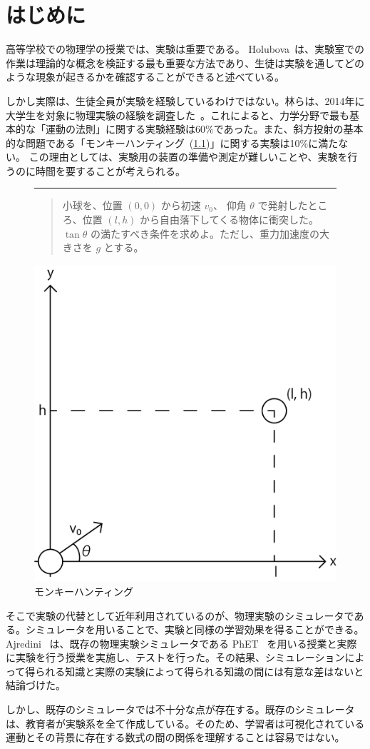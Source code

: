 \chapter{はじめに} \label{intro}

高等学校での物理学の授業では、実験は重要である。
Holubova~\cite{holubova_2019}は、実験室での作業は理論的な概念を検証する最も重要な方法であり、生徒は実験を通してどのような現象が起きるかを確認することができると述べている。

しかし実際は、生徒全員が実験を経験しているわけではない。林らは、2014年に大学生を対象に物理実験の経験を調査した~\cite{2015KJ00010038066}。これによると、力学分野で最も基本的な「運動の法則」に関する実験経験は60\%であった。また、斜方投射の基本的な問題である「モンキーハンティング~(\ref{monkey_hunting})」に関する実験は10\%に満たない。
この理由としては、実験用の装置の準備や測定が難しいことや、実験を行うのに時間を要することが考えられる。

\begin{figure}[htb]
\noindent\rule{\linewidth}{0.4pt}
\begin{quote}
小球を、位置 $(0, 0)$ から初速 $v_0$、 仰角 $\theta$ で発射したところ、位置 $(l, h)$ から自由落下してくる物体に衝突した。 $\tan \theta$ の満たすべき条件を求めよ。ただし、重力加速度の大きさを $g$ とする。
\end{quote}
\centering
\includegraphics[width=0.3\linewidth]{work/monkey_hunting.png}
\caption{モンキーハンティング} \label{monkey_hunting}
\end{figure}

そこで実験の代替として近年利用されているのが、物理実験のシミュレータである。シミュレータを用いることで、実験と同様の学習効果を得ることができる。Ajredini~\cite{ajredini_real_2014} は、既存の物理実験シミュレータである PhET~\cite{perkins_phet_2006} を用いる授業と実際に実験を行う授業を実施し、テストを行った。その結果、シミュレーションによって得られる知識と実際の実験によって得られる知識の間には有意な差はないと結論づけた。

しかし、既存のシミュレータでは不十分な点が存在する。既存のシミュレータは、教育者が実験系を全て作成している。そのため、学習者は可視化されている運動とその背景に存在する数式の間の関係を理解することは容易ではない。

